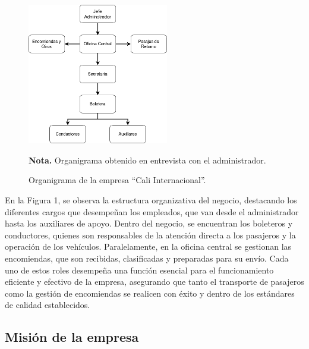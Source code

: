 	\vspace{0.3cm} %
	
	\begin{figure}[h] %
		\caption[Descripción corta]
		{\newline Organigrama de la empresa ``Cali Internacional''.} %
		\centering
		\includegraphics[width=0.55\textwidth]{imagenes/figura1_1.png} %
		
		\begin{flushleft}
			\hspace{1.20cm} \textbf{Nota.} Organigrama obtenido en entrevista con el administrador. %
		\end{flushleft}
		\vspace{-16pt}
		\label{fig:figura2_1} %
	\end{figure}
	
	En la Figura 1, se observa la estructura organizativa del negocio, destacando los diferentes cargos que desempeñan los empleados, que van desde el administrador hasta los auxiliares de apoyo. Dentro del negocio, se encuentran los boleteros y conductores, quienes son responsables de la atención directa a los pasajeros y la operación de los vehículos. Paralelamente, en la oficina central se gestionan las encomiendas, que son recibidas, clasificadas y preparadas para su envío. Cada uno de estos roles desempeña una función esencial para el funcionamiento eficiente y efectivo de la empresa, asegurando que tanto el transporte de pasajeros como la gestión de encomiendas se realicen con éxito y dentro de los estándares de calidad establecidos.
	
	\subsection*{Misión de la empresa}
	
